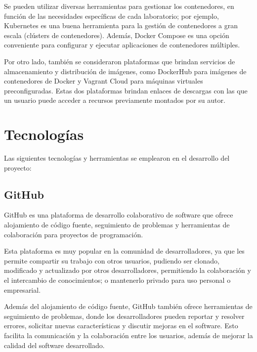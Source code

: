             Se pueden utilizar diversas herramientas para gestionar los contenedores, en función de las necesidades específicas de cada laboratorio; por ejemplo, Kubernetes es una buena herramienta para la gestión de contenedores a gran escala (clústers de contenedores). Además, Docker Compose es una opción conveniente para configurar y ejecutar aplicaciones de contenedores múltiples.
            
            Por otro lado, también se consideraron plataformas que brindan servicios de almacenamiento y distribución de imágenes, como DockerHub para imágenes de contenedores de Docker y Vagrant Cloud para máquinas virtuales preconfiguradas. Estas dos plataformas brindan enlaces de descargas con las que un usuario puede acceder a recursos previamente montados por su autor.
        
    \section{Tecnologías}
    
        Las siguientes tecnologías y herramientas se emplearon en el desarrollo del proyecto:
        
        \subsection{GitHub}
        
            GitHub es una plataforma de desarrollo colaborativo de software que ofrece alojamiento de código fuente, seguimiento de problemas y herramientas de colaboración para proyectos de programación.
            
            Esta plataforma es muy popular en la comunidad de desarrolladores, ya que les permite compartir su trabajo con otros usuarios, pudiendo ser clonado, modificado y actualizado por otros desarrolladores, permitiendo la colaboración y el intercambio de conocimientos; o mantenerlo privado para uso personal o empresarial.
            
            Además del alojamiento de código fuente, GitHub también ofrece herramientas de seguimiento de problemas, donde los desarrolladores pueden reportar y resolver errores, solicitar nuevas características y discutir mejoras en el software. Esto facilita la comunicación y la colaboración entre los usuarios, además de mejorar la calidad del software desarrollado.
            
            \newpage


